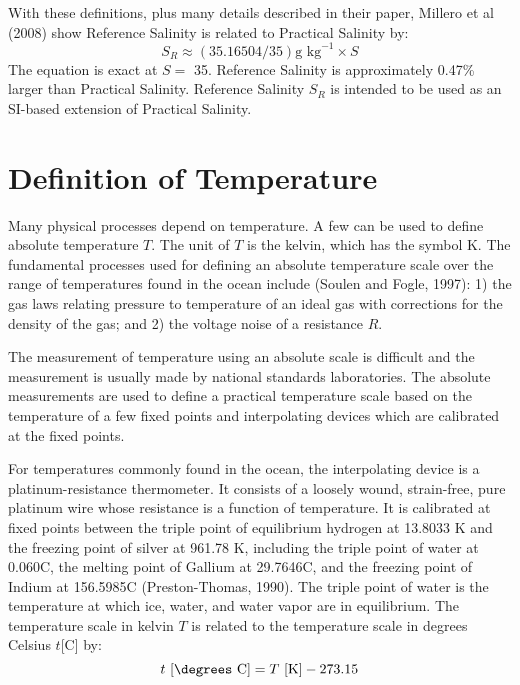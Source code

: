 With these definitions, plus many details described in their paper,
Millero et al (2008) show Reference Salinity is related to Practical
Salinity by:
\begin{equation}
S_R \approx (35.16504/35) \text{g kg}^{-1} \times S
\end{equation}
The equation is exact at $S = $ 35. Reference Salinity is
approximately 0.47\% larger than Practical Salinity. Reference
Salinity $S_R$ is intended to be used as an SI-based extension of
Practical Salinity.

\section{Definition of Temperature}
Many physical processes depend on
temperature. A few can be used to define absolute
temperature $T$. The unit of $T$ is the kelvin, which has the symbol
K. The fundamental processes used for defining an absolute temperature
scale over the range of temperatures found in the ocean include
(Soulen and Fogle, 1997): 1) the gas laws relating pressure to
temperature of an ideal gas with corrections for the density of the
gas; and 2) the voltage noise of a resistance $R$.

The measurement of temperature using an absolute
scale is difficult and the measurement is
usually made by national standards laboratories. The absolute
measurements are used to define a practical temperature
scale based on the temperature of a
few fixed points and interpolating devices which are calibrated at the
fixed points.

For temperatures commonly found in the ocean, the interpolating device
is a platinum-resistance thermometer. It consists of a loosely wound,
strain-free, pure platinum wire whose resistance is a function of
temperature. It is calibrated at fixed points between the triple point
of equilibrium hydrogen at 13.8033 K and the freezing point of silver
at 961.78 K, including the triple point of water at 0.060\degrees C,
the melting point of Gallium at 29.7646\degrees C, and the freezing
point of Indium at 156.5985\degrees C (Preston-Thomas, 1990). The
triple point of water is the temperature at which ice, water, and
water vapor are in equilibrium. The temperature scale in kelvin $T$ is
related to the temperature scale in degrees Celsius $t$[\degrees C]
by:
\begin{equation}
t \text{ [\degrees C]} = T \text{ [K]} -273.15
\end{equation}


